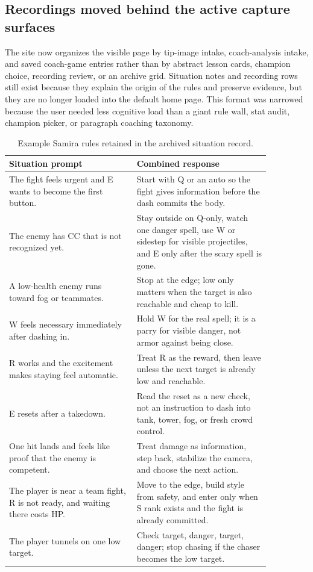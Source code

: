 \documentclass[12pt,letterpaper]{article}
\begin{document}
\subsection{Recordings moved behind the active capture surfaces}

The site now organizes the visible page by tip-image intake, coach-analysis intake, and saved coach-game entries rather than by abstract lesson cards, champion choice, recording review, or an archive grid. Situation notes and recording rows still exist because they explain the origin of the rules and preserve evidence, but they are no longer loaded into the default home page. This format was narrowed because the user needed less cognitive load than a giant rule wall, stat audit, champion picker, or paragraph coaching taxonomy.

\begin{table}[H]
\centering
\caption{Example Samira rules retained in the archived situation record.}
{\small
\setlength{\tabcolsep}{6pt}
\begin{tabular}{p{0.42\linewidth}p{0.44\linewidth}}
\toprule
Situation prompt & Combined response \\
\midrule
The fight feels urgent and E wants to become the first button. & Start with Q or an auto so the fight gives information before the dash commits the body. \\
The enemy has CC that is not recognized yet. & Stay outside on Q-only, watch one danger spell, use W or sidestep for visible projectiles, and E only after the scary spell is gone. \\
A low-health enemy runs toward fog or teammates. & Stop at the edge; low only matters when the target is also reachable and cheap to kill. \\
W feels necessary immediately after dashing in. & Hold W for the real spell; it is a parry for visible danger, not armor against being close. \\
R works and the excitement makes staying feel automatic. & Treat R as the reward, then leave unless the next target is already low and reachable. \\
E resets after a takedown. & Read the reset as a new check, not an instruction to dash into tank, tower, fog, or fresh crowd control. \\
One hit lands and feels like proof that the enemy is competent. & Treat damage as information, step back, stabilize the camera, and choose the next action. \\
The player is near a team fight, R is not ready, and waiting there costs HP. & Move to the edge, build style from safety, and enter only when S rank exists and the fight is already committed. \\
The player tunnels on one low target. & Check target, danger, target, danger; stop chasing if the chaser becomes the low target. \\
\bottomrule
\end{tabular}
}
\end{table}
\end{document}
